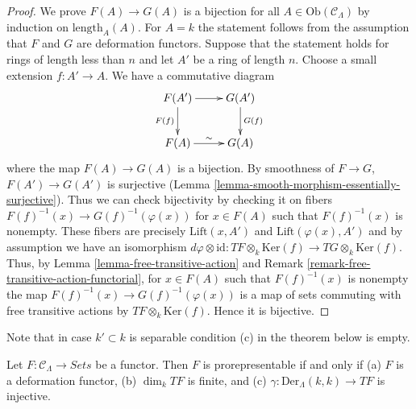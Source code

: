 \begin{proof}
We prove $F(A) \to G(A)$ is a bijection for all $A \in 
\text{Ob}(\mathcal{C}_\Lambda)$ by induction on 
$\text{length}_{A}(A)$.  For $A = k$ the statement follows from the 
assumption that $F$ and $G$ are deformation functors. Suppose that the 
statement holds for rings of length less than $n$ and let $A'$ be a ring of 
length $n$. Choose a small extension $f : A' \to A$.  We have a 
commutative diagram
$$
\xymatrix{
F(A') \ar[r] \ar[d]_{F(f)} & G(A') \ar[d]^{G(f)} \\
F(A) \ar[r]^{\sim} & G(A)
}
$$
where the map $F(A) \to G(A)$ is a bijection.  By smoothness of $F 
\to G$, $F(A') \to G(A')$ is surjective (Lemma 
\ref{lemma-smooth-morphism-essentially-surjective}).  Thus we can check 
bijectivity by checking it on fibers $F(f)^{-1}(x) \to 
G(f)^{-1}(\varphi(x))$ for $x \in F(A)$ such that $F(f)^{-1}(x)$ is nonempty.  
These fibers are precisely $\text{Lift}(x,A')$ and
$\text{Lift}(\varphi(x),A')$ and by assumption we have an isomorphism
$d\varphi \otimes \text{id} :
TF \otimes_k \text{Ker}(f)  \to TG \otimes_k \text{Ker}(f)$.
Thus, by
Lemma \ref{lemma-free-transitive-action} and
Remark \ref{remark-free-transitive-action-functorial},
for $x \in F(A)$ such that $F(f)^{-1}(x)$ is nonempty the map
$F(f)^{-1}(x) \to G(f)^{-1}(\varphi(x))$ is a map of sets commuting
with free transitive actions by $TF \otimes_k \text{Ker}(f)$.
Hence it is bijective.
\end{proof}

\noindent
Note that in case $k' \subset k$ is separable condition (c) in
the theorem below is empty.

\begin{theorem}
\label{theorem-Schlessinger-prorepresentability}
Let $F: \mathcal{C}_\Lambda \to \textit{Sets}$ be a functor.  
Then $F$ is prorepresentable if and only if
(a) $F$ is a deformation functor,
(b) $\dim_k TF$ is finite, and (c) $\gamma : \text{Der}_\Lambda(k, k) \to TF$
is injective.
\end{theorem}

